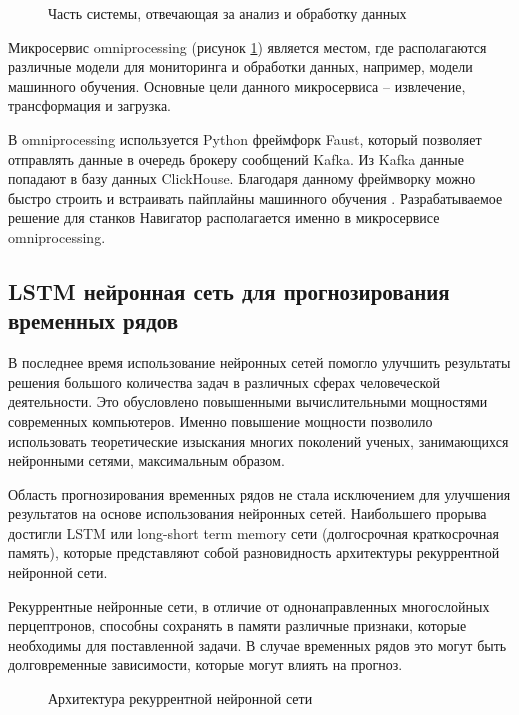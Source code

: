 \begin{figure}[h]
    \caption{Часть системы, отвечающая за анализ и обработку данных}
    \label{partsys2}
\end{figure}

Микросервис omniprocessing (рисунок \ref{partsys2}) является местом, 
где располагаются различные модели для мониторинга и обработки данных,
например, модели машинного обучения.
Основные цели данного микросервиса -- извлечение, трансформация и загрузка.

В omniprocessing используется Python фреймфорк Faust, который позволяет отправлять
данные в очередь брокеру сообщений Kafka. Из Kafka данные попадают в базу данных ClickHouse.
Благодаря данному фреймворку можно быстро строить и встраивать пайплайны машинного обучения \cite{faust}. 
Разрабатываемое решение для станков Навигатор располагается именно
в микросервисе omniprocessing.



\subsection{LSTM нейронная сеть для прогнозирования временных рядов}

В последнее время использование нейронных сетей помогло улучшить
результаты решения большого количества задач в различных сферах человеческой деятельности.
Это обусловлено повышенными вычислительными мощностями современных компьютеров.
Именно повышение мощности позволило использовать теоретические изыскания
многих поколений ученых, занимающихся нейронными сетями, максимальным образом.

Область прогнозирования временных рядов не стала исключением
для улучшения результатов на основе использования нейронных сетей.
Наибольшего прорыва достигли LSTM или long-short term memory сети (долгосрочная краткосрочная память),
которые представляют собой разновидность архитектуры рекуррентной нейронной сети.

Рекуррентные нейронные сети, в отличие от однонаправленных многослойных перцептронов,
способны сохранять в памяти различные признаки, которые необходимы для поставленной задачи.
В случае временных рядов это могут быть долговременные зависимости, которые
могут влиять на прогноз.

\begin{figure}[H]
    \caption{Архитектура рекуррентной нейронной сети}
    \label{rnn}
\end{figure}


